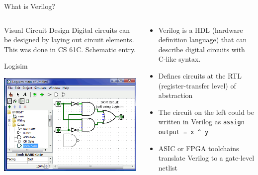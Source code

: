 \documentclass{beamer}
\begin{document}
\begin{frame}{What is Verilog?}
	\begin{columns}
		\begin{column}{0.5\textwidth}
			\begin{block}{Visual Circuit Design}
				Digital circuits can be designed by laying out circuit elements. This was done in CS 61C. Schematic entry.
			\end{block}
			\begin{block}{Logisim}
				\centerline{\includegraphics[width=\textwidth]{logisim_screenshot.png}}
			\end{block}
		\end{column}
		\begin{column}{0.5\textwidth}
			\begin{itemize}
				\item Verilog is a HDL (hardware definition language) that can describe digital circuits with C-like syntax.
				\item Defines circuits at the RTL (register-transfer level) of abstraction
				\item The circuit on the left could be written in Verilog as \texttt{assign output = x \^{} y}
				\item ASIC or FPGA toolchains translate Verilog to a gate-level netlist
			\end{itemize}
		\end{column}
	\end{columns}
\end{frame}
\end{document}
